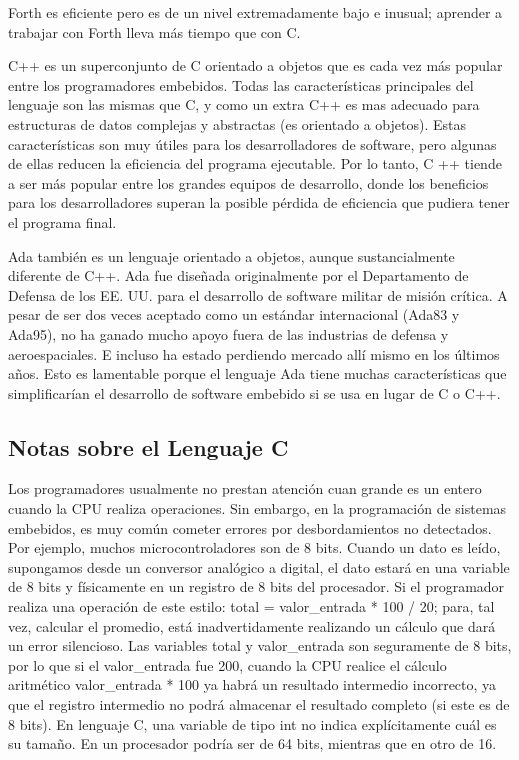 \documentclass[output=paper, 
colorlinks,
citecolor=brown,
newtxmath
]{langscibook}
\begin{document}
Forth es eficiente pero es de un nivel extremadamente bajo e inusual; aprender a trabajar 
con Forth lleva más tiempo que con C.

C++ es un superconjunto de C orientado a objetos que es cada vez más popular entre los programadores embebidos. 
Todas las características principales del lenguaje son las mismas que C, y como un extra
C++ es mas adecuado para estructuras de datos complejas y abstractas (es orientado a objetos).
Estas características son muy útiles para los desarrolladores de software, pero 
algunas de ellas reducen la eficiencia del programa ejecutable. 
Por lo tanto, C ++ tiende a ser más popular entre los grandes equipos de 
desarrollo, donde los beneficios para los desarrolladores superan la posible
pérdida de eficiencia que pudiera tener el programa final.

Ada también es un lenguaje orientado a objetos, aunque sustancialmente diferente de C++.
Ada fue diseñada originalmente por el Departamento de Defensa de los EE. UU. para 
el desarrollo de software militar de misión crítica.  
A pesar de ser dos veces aceptado como un estándar internacional (Ada83 y Ada95), 
no ha ganado mucho apoyo fuera de las industrias de defensa y aeroespaciales. 
E incluso ha estado perdiendo mercado allí mismo en los últimos años. 
Esto es lamentable porque el lenguaje Ada tiene muchas características 
que simplificarían el desarrollo de software embebido si se usa en lugar de C o C++.














\subsection {Notas sobre el Lenguaje C}



Los programadores usualmente no prestan atención cuan grande
es un entero cuando la CPU realiza operaciones.
Sin embargo, en la programación de sistemas embebidos,
es muy común cometer errores por desbordamientos no
detectados. Por ejemplo, muchos microcontroladores son de 8 bits.
Cuando un dato es leído, supongamos desde un conversor analógico a 
digital, el dato estará en una variable de 8 bits y físicamente
en un registro de 8 bits del procesador.
Si el programador realiza una operación de este estilo:
total = valor\_entrada * 100 / 20; para, tal vez, calcular 
el promedio, está inadvertidamente
realizando un cálculo que dará un error silencioso.
Las variables total y valor\_entrada son seguramente de 8 bits,
por lo que si el valor\_entrada fue 200, cuando la CPU 
realice el cálculo aritmético valor\_entrada * 100 ya habrá
un resultado intermedio incorrecto, ya que el registro
intermedio no podrá almacenar el resultado completo (si este es de 8 bits).
En lenguaje C, una variable de tipo int no indica explícitamente 
cuál es su tamaño. En un procesador podría ser de 64 bits, mientras
que en otro de 16.
\end{document}
